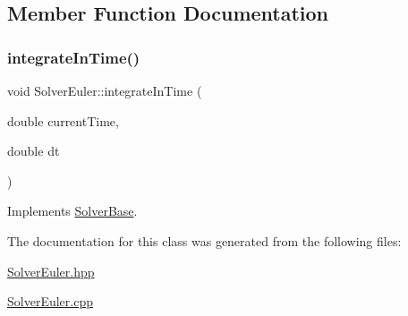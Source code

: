 \subsection{Member Function Documentation}
\mbox{\label{class_solver_euler_a64caa7276a35f9e5408bec75bc2d3189}} 
\subsubsection{\texorpdfstring{integrate\+In\+Time()}{integrateInTime()}}
{\footnotesize\ttfamily void Solver\+Euler\+::integrate\+In\+Time (\begin{DoxyParamCaption}\item[{double}]{current\+Time,  }\item[{double}]{dt }\end{DoxyParamCaption})\hspace{0.3cm}{\ttfamily [virtual]}}



Implements \mbox{\hyperlink{class_solver_base_a14b5e9482f698d36dff3b43d3a4f05f1}{Solver\+Base}}.



The documentation for this class was generated from the following files\+:\begin{DoxyCompactItemize}
\item 
\mbox{\hyperlink{_solver_euler_8hpp}{Solver\+Euler.\+hpp}}\item 
\mbox{\hyperlink{_solver_euler_8cpp}{Solver\+Euler.\+cpp}}\end{DoxyCompactItemize}
